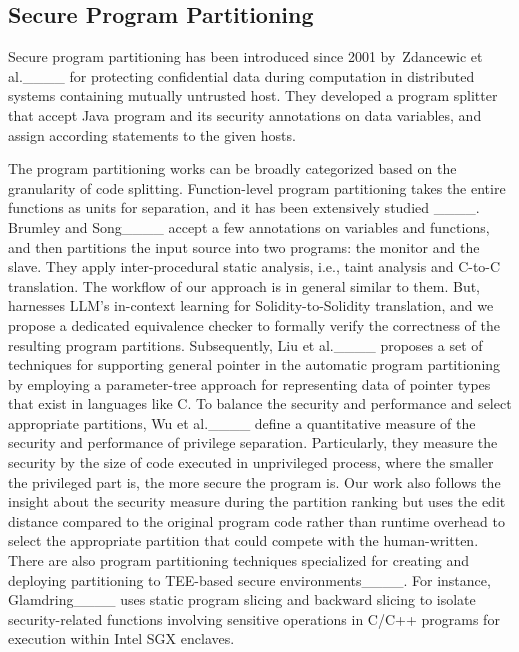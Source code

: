 \subsection{Secure Program Partitioning}
Secure program partitioning has been introduced since 2001 by~Zdancewic et al.____ for protecting confidential data during computation in distributed systems containing mutually untrusted host.
They developed a program splitter that accept Java program and its security annotations on data variables, and assign according statements to the given hosts.

The program partitioning works can be broadly categorized based on the granularity of code splitting.
Function-level program partitioning takes the entire functions as units for separation, and it has been extensively studied ____.
Brumley and Song____ accept a few annotations on variables and functions, and then partitions the input source into two programs: the monitor and the slave.
They apply inter-procedural static analysis, i.e., taint analysis and C-to-C translation.
The workflow of our approach is in general similar to them. But, \tool harnesses LLM's in-context learning for Solidity-to-Solidity translation, and we propose a dedicated equivalence checker to formally verify the correctness of the resulting program partitions. 
Subsequently, 
Liu et al.____ proposes a set of techniques for supporting general pointer in the automatic program partitioning by employing a parameter-tree approach for representing data of pointer types that exist in languages like C. 
To balance the security and performance and select appropriate partitions, Wu et al.____ define a quantitative measure of the security
and performance of privilege separation.
Particularly, they measure the security by the size of code executed in unprivileged process, where the smaller the privileged part is,
the more secure the program is.
Our work also follows the insight about the security measure during the partition ranking but \tool uses the edit distance compared to the original program code rather than runtime overhead to select the appropriate partition that could compete with the human-written.
There are also program partitioning techniques specialized for creating and deploying partitioning to TEE-based secure environments____.
For instance, Glamdring____ uses static program slicing and backward slicing to isolate security-related functions involving sensitive operations in C/C++ programs for execution within Intel SGX enclaves. 
